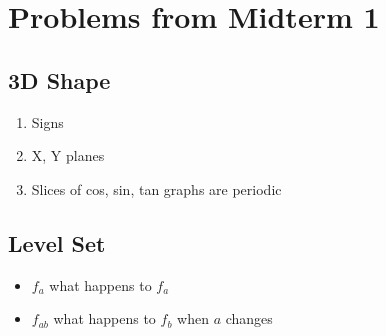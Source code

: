 \section{Problems from Midterm 1}

  \subsection{3D Shape}

    \begin{enumerate}
      \item Signs
      \item X, Y planes
      \item Slices of cos, sin, tan graphs are periodic
    \end{enumerate}

  \subsection{Level Set}

    \begin{itemize}
      \item $ f_{a} $ what happens to $ f_{a} $
      \item $ f_{ab} $ what happens to $ f_{b} $ when $ a $ changes
    \end{itemize}